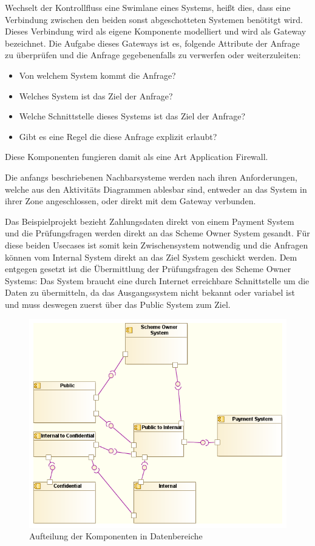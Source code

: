 Wechselt der Kontrollfluss eine Swimlane eines Systems, heißt dies, dass eine Verbindung zwischen den beiden sonst abgeschotteten Systemen benötitgt wird. Dieses Verbindung wird als eigene Komponente modelliert und wird als Gateway bezeichnet. Die Aufgabe dieses Gateways ist es, folgende Attribute der Anfrage zu überprüfen und die Anfrage gegebenenfalls zu verwerfen oder weiterzuleiten:

\begin{itemize}
  \item Von welchem System kommt die Anfrage?
  \item Welches System ist das Ziel der Anfrage?
  \item Welche Schnittstelle dieses Systems ist das Ziel der Anfrage?
  \item Gibt es eine Regel die diese Anfrage explizit erlaubt?
\end{itemize}

Diese Komponenten fungieren damit als eine Art Application Firewall.

Die anfangs beschriebenen Nachbarsysteme werden nach ihren Anforderungen, welche aus den Aktivitäts Diagrammen ablesbar sind, entweder an das System in ihrer Zone angeschlossen, oder direkt mit dem Gateway verbunden.

Das Beispielprojekt bezieht Zahlungsdaten direkt von einem Payment System und die Prüfungsfragen werden direkt an das Scheme Owner System gesandt. Für diese beiden Usecases ist somit kein Zwischensystem notwendig und die Anfragen können vom Internal System direkt an das Ziel System geschickt werden. Dem entgegen gesetzt ist die Übermittlung der Prüfungsfragen des Scheme Owner Systems: Das System braucht eine durch Internet erreichbare Schnittstelle um die Daten zu übermitteln, da das Ausgangssystem nicht bekannt oder variabel ist und muss deswegen zuerst über das Public System zum Ziel.

\begin{figure}[H]
    \centering
    \includegraphics[scale=0.7]{uml/dataarch.png}
    \caption{Aufteilung der Komponenten in Datenbereiche}
\end{figure}

